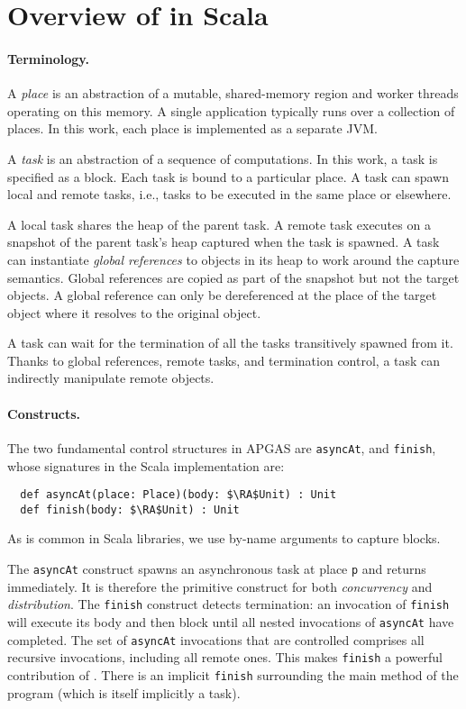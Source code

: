 \section{Overview of \apgas in Scala}
\label{sec:apgas}

\paragraph{Terminology.}
A {\em place} is an abstraction of a mutable, shared-memory region and worker threads operating on this memory.
A single application typically runs over a collection of places. In this work, each place is implemented as a separate JVM.

A {\em task} is an abstraction of a sequence of computations. In this work, a task is specified as a block.
Each task is bound to a particular place. 
A task can spawn local and remote tasks, i.e., tasks to be executed in the same place or elsewhere.

A local task shares the heap of the parent task. A remote task executes on a snapshot of the parent task's heap captured when the task is spawned. A task can instantiate \emph{global references} to objects in its heap to work around the capture semantics.
Global references are copied as part of the snapshot but not the target objects. A global reference can only be dereferenced
at the place of the target object where it resolves to the original object.

A task can wait for the termination of all the tasks transitively spawned from it.
Thanks to global references, remote tasks, and termination control,
a task can indirectly manipulate remote objects.

\paragraph{Constructs.}
The two fundamental control structures in APGAS are
 \lstinline{asyncAt}, and \lstinline{finish}, whose signatures in
the Scala implementation are:
\begin{lstlisting}
  def asyncAt(place: Place)(body: $\RA$Unit) : Unit
  def finish(body: $\RA$Unit) : Unit
\end{lstlisting}
As is common in Scala libraries, we use by-name arguments to capture blocks.

The \lstinline{asyncAt} construct spawns an asynchronous task at place \lstinline{p} and returns
immediately. It is therefore the primitive construct for both \emph{concurrency} and \emph{distribution}.
The \lstinline{finish} construct detects termination: an invocation of
\lstinline{finish} will execute its body and then block until all nested invocations
of \lstinline{asyncAt} have completed. The set of \lstinline{asyncAt} invocations
that are controlled comprises all recursive invocations, including all remote
ones. This makes \lstinline{finish} a powerful contribution of \apgas.
There is an implicit \lstinline{finish} surrounding the main method of the program (which is itself implicitly a task).

